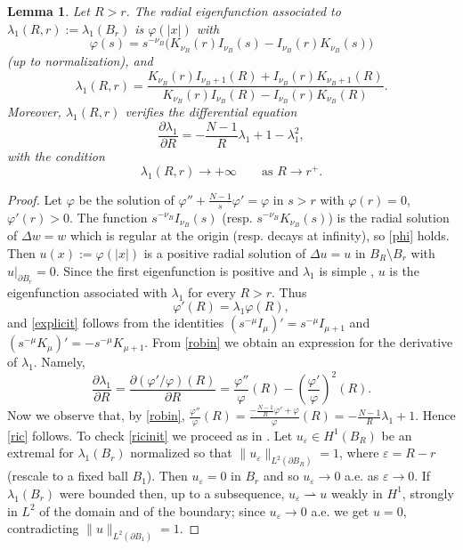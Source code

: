 \documentclass[11pt]{amsart}
\newtheorem{lemma}{Lemma}[section]
\theoremstyle{remark}
\numberwithin{equation}{section}
\begin{document}
\begin{lemma}\label{l.riccati}
Let $R>r$. The radial eigenfunction associated to $\lambda_1(R,r):=\lambda_1(B_r)$ is $\varphi(|x|)$ with
\begin{equation}\label{phi}
\varphi(s)=s^{-\nu_B}\big(K_{\nu_B}(r)I_{\nu_B}(s)-I_{\nu_B}(r)K_{\nu_B}(s)\big)
\end{equation}
(up to normalization), and
\begin{equation}\label{explicit}
\lambda_1(R,r)=\frac{K_{\nu_B}(r)I_{\nu_B+1}(R)+I_{\nu_B}(r)K_{\nu_B+1}(R)}{K_{\nu_B}(r)I_{\nu_B}(R)-I_{\nu_B}(r)K_{\nu_B}(R)}.
\end{equation}
Moreover, $\lambda_1(R,r)$ verifies the differential equation
\begin{equation}\label{ric}
\frac{\partial\lambda_1}{\partial R}=-\frac{N-1}R\lambda_1+1-\lambda_1^2,
\end{equation}
with the condition
\begin{equation}\label{ricinit}
\lambda_1(R,r)\to+\infty\qquad\text{as } R\to r^+.
\end{equation}
\end{lemma}

\begin{proof}
Let $\varphi$ be the solution of $\varphi''+\frac{N-1}s\varphi'=\varphi$ in $s>r$ with $\varphi(r)=0$, $\varphi'(r)>0$. The function $s^{-\nu_B}I_{\nu_B}(s)$ (resp. $s^{-\nu_B}K_{\nu_B}(s)$) is the radial solution of $\Delta w=w$ which is regular at the origin (resp. decays at infinity), so \eqref{phi} holds. Then $u(x):=\varphi(|x|)$ is a positive radial solution of $\Delta u=u$ in $B_R\setminus B_r$ with $u|_{\partial B_r}=0$. Since the first eigenfunction is positive and $\lambda_1$ is simple \cite{MR}, $u$ is the eigenfunction associated with $\lambda_1$ for every $R>r$. Thus
\begin{equation}\label{robin}
\varphi'(R)=\lambda_1\varphi(R),
\end{equation}
and \eqref{explicit} follows from the identities $(s^{-\mu}I_\mu)'=s^{-\mu}I_{\mu+1}$ and $(s^{-\mu}K_\mu)'=-s^{-\mu}K_{\mu+1}$. From \eqref{robin} we obtain an expression for the derivative of $\lambda_1$. Namely,
\[
\frac{\partial\lambda_1}{\partial R}=\frac{\partial(\varphi'/\varphi)(R)}{\partial R}=\frac{\varphi''}{\varphi}(R)-\left(\frac{\varphi'}{\varphi}\right)^2(R).
\]
Now we observe that, by \eqref{robin}, $\frac{\varphi''}\varphi(R)=\frac{-\frac{N-1}R\varphi'+\varphi}\varphi(R)=-\frac{N-1}R\lambda_1+1$. Hence \eqref{ric} follows. To check \eqref{ricinit} we proceed as in \cite{FBRW1}. Let $u_\varepsilon\in H^1(B_R)$ be an extremal for $\lambda_1(B_r)$ normalized so that $\|u_\varepsilon\|_{L^2(\partial B_R)}=1$, where $\varepsilon=R-r$ (rescale to a fixed ball $B_1$). Then $u_\varepsilon=0$ in $B_r$ and so $u_\varepsilon\to0$ a.e. as $\varepsilon\to0$. If $\lambda_1(B_r)$ were bounded then, up to a subsequence, $u_\varepsilon\rightharpoonup u$ weakly in $H^1$, strongly in $L^2$ of the domain and of the boundary; since $u_\varepsilon\to0$ a.e. we get $u=0$, contradicting $\|u\|_{L^2(\partial B_1)}=1$.
\end{proof}
\end{document}
